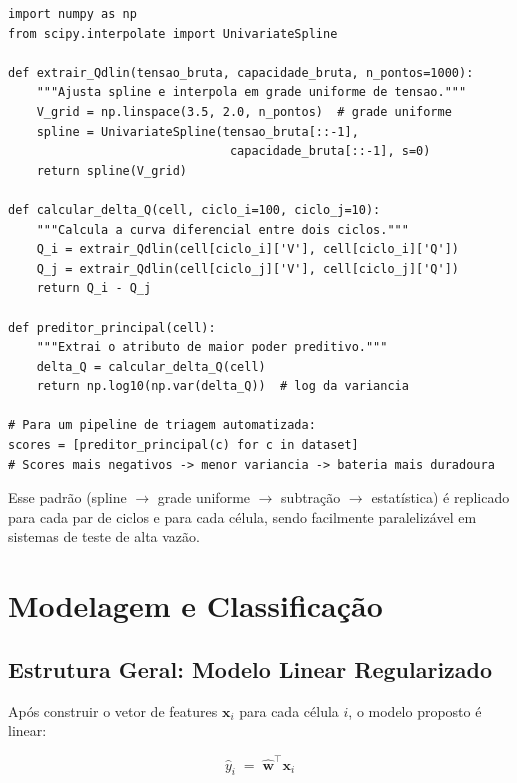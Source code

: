 \documentclass[12pt,a4paper]{article}
\begin{document}
\begin{lstlisting}[style=python, caption={Esquema de extra\c{c}\~ao do preditor principal}]
import numpy as np
from scipy.interpolate import UnivariateSpline

def extrair_Qdlin(tensao_bruta, capacidade_bruta, n_pontos=1000):
    """Ajusta spline e interpola em grade uniforme de tensao."""
    V_grid = np.linspace(3.5, 2.0, n_pontos)  # grade uniforme
    spline = UnivariateSpline(tensao_bruta[::-1],
                               capacidade_bruta[::-1], s=0)
    return spline(V_grid)

def calcular_delta_Q(cell, ciclo_i=100, ciclo_j=10):
    """Calcula a curva diferencial entre dois ciclos."""
    Q_i = extrair_Qdlin(cell[ciclo_i]['V'], cell[ciclo_i]['Q'])
    Q_j = extrair_Qdlin(cell[ciclo_j]['V'], cell[ciclo_j]['Q'])
    return Q_i - Q_j

def preditor_principal(cell):
    """Extrai o atributo de maior poder preditivo."""
    delta_Q = calcular_delta_Q(cell)
    return np.log10(np.var(delta_Q))  # log da variancia

# Para um pipeline de triagem automatizada:
scores = [preditor_principal(c) for c in dataset]
# Scores mais negativos -> menor variancia -> bateria mais duradoura
\end{lstlisting}

Esse padr\~ao (spline $\rightarrow$ grade uniforme $\rightarrow$ subtra\c{c}\~ao $\rightarrow$
estat\'{i}stica) \'{e} replicado para cada par de ciclos e para cada c\'{e}lula, sendo
facilmente paraleliz\'{a}vel em sistemas de teste de alta vaz\~ao.

\section{Modelagem e Classifica\c{c}\~ao}

\subsection{Estrutura Geral: Modelo Linear Regularizado}

Ap\'{o}s construir o vetor de features $\mathbf{x}_i$ para cada c\'{e}lula $i$,
o modelo proposto \'{e} linear:

\begin{equation}
  \hat{y}_i \;=\; \hat{\mathbf{w}}^\top \mathbf{x}_i
  \label{eq:modelo_linear}
\end{equation}
\end{document}
